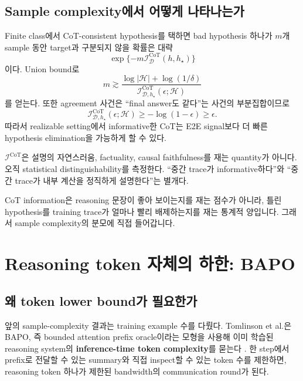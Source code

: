 \documentclass[11pt,a4paper,oneside,openany]{memoir}
\newcommand{\Hc}{\mathcal{H}}
\newcommand{\D}{\mathcal{D}}
\newcommand{\Icot}{\mathcal{I}^{\mathrm{CoT}}}
\theoremstyle{definition}
\begin{document}
\section{Sample complexity에서 어떻게 나타나는가}

Finite class에서 CoT-consistent hypothesis를 택하면 bad hypothesis 하나가 $m$개 sample 동안 target과 구분되지 않을 확률은 대략
\[
\exp\{-m\Icot_\D(h,h_\star)\}
\]
이다. Union bound로
\[
\boxed{
 m\gtrsim
 \frac{\log|\Hc|+\log(1/\delta)}
 {\Icot_{\D,h_\star}(\epsilon;\Hc)}
}
\]
를 얻는다. 또한 agreement 사건은 ``final answer도 같다''는 사건의 부분집합이므로
\[
\Icot_{\D,h_\star}(\epsilon;\Hc)\ge -\log(1-\epsilon)\ge\epsilon.
\]
따라서 realizable setting에서 informative한 CoT는 E2E signal보다 더 빠른 hypothesis elimination을 가능하게 할 수 있다.

\begin{warningbox}
$\Icot$은 설명의 자연스러움, factuality, causal faithfulness를 재는 quantity가 아니다. 오직 statistical distinguishability를 측정한다. ``중간 trace가 informative하다''와 ``중간 trace가 내부 계산을 정직하게 설명한다''는 별개다.
\end{warningbox}

\begin{presentbox}
CoT information은 reasoning 문장이 좋아 보이는지를 재는 점수가 아니라, 틀린 hypothesis를 training trace가 얼마나 빨리 배제하는지를 재는 통계적 양입니다. 그래서 sample complexity의 분모에 직접 들어갑니다.
\end{presentbox}

\chapter{Reasoning token 자체의 하한: BAPO}

\section{왜 token lower bound가 필요한가}

앞의 sample-complexity 결과는 training example 수를 다뤘다. Tomlinson et al.은 BAPO, 즉 bounded attention prefix oracle이라는 모형을 사용해 이미 학습된 reasoning system의 \textbf{inference-time token complexity}를 묻는다 \cite{tomlinson2026}. 한 step에서 prefix로 전달할 수 있는 summary와 직접 inspect할 수 있는 token 수를 제한하면, reasoning token 하나가 제한된 bandwidth의 communication round가 된다.
\end{document}
